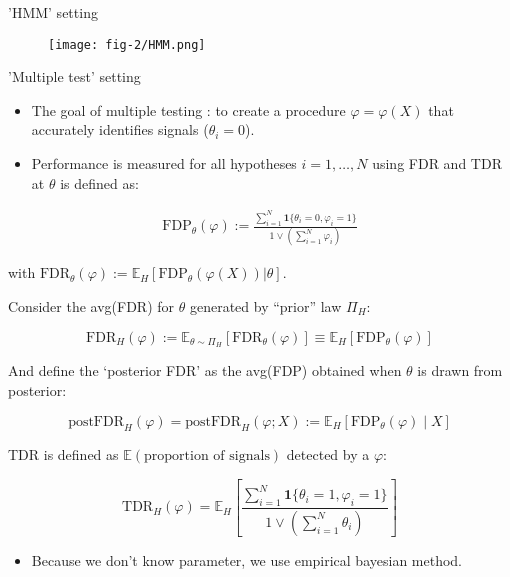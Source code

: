 \documentclass[10pt, aspectratio=169]{beamer}
\begin{document}
\begin{frame}{'HMM' setting}
    \begin{figure}[h]
    \centering
    \texttt{[image: fig-2/HMM.png]}
    \end{figure}
\end{frame}
\begin{frame}{'Multiple test' setting}
\begin{itemize}[label=\scalebox{0.5}{$\bullet$}]
    \item The goal of multiple testing : to create a procedure \(\varphi = \varphi(X)\) that accurately identifies signals (\(\theta_i = 0\)).
    \item Performance is measured for all hypotheses \(i = 1, \ldots, N\) using FDR and TDR at \(\theta\) is defined as:
\end{itemize}

\begin{align}
    \text{FDP}_\theta(\varphi) := \frac{\sum_{i=1}^N \mathbf{1}\{\theta_i = 0, \varphi_i = 1\}}{1 \vee \left(\sum_{i=1}^N \varphi_i\right)} \tag{2}
\end{align}

with \(\text{FDR}_\theta(\varphi) := \mathbb{E}_H[\text{FDP}_\theta(\varphi(X)) | \theta]\).

\end{frame}
\begin{frame}

Consider the avg(FDR) for \(\theta\) generated by “prior” law \(\Pi_H\):

\[
\text{FDR}_H(\varphi) := \mathbb{E}_{\theta \sim \Pi_H} \left[ \text{FDR}_\theta(\varphi) \right] \equiv \mathbb{E}_H \left[ \text{FDP}_\theta(\varphi) \right] \tag{3}
\]

And define the ‘posterior FDR’ as the avg(FDP) obtained when \(\theta\) is drawn from posterior:

\[
\text{postFDR}_H(\varphi) = \text{postFDR}_H(\varphi;X) := \mathbb{E}_H\left[\text{FDP}_\theta(\varphi) \mid X\right] \tag{4}
\]

TDR is defined as $\mathbb{E}(\text{proportion of signals})$ detected by a $\varphi$:

\[
\text{TDR}_H(\varphi) = \mathbb{E}_H \left[ \frac{\sum_{i=1}^N \mathbf{1}\{\theta_i = 1, \varphi_i = 1\}}{1 \vee \left(\sum_{i=1}^N \theta_i\right)} \right] \tag{5}
\]

\vspace{2em}
\begin{itemize}[label=\scalebox{0.5}{$\blacksquare$}]
    \item Because we don't know parameter, we use empirical bayesian method.
\end{itemize}
\end{frame}
\end{document}
